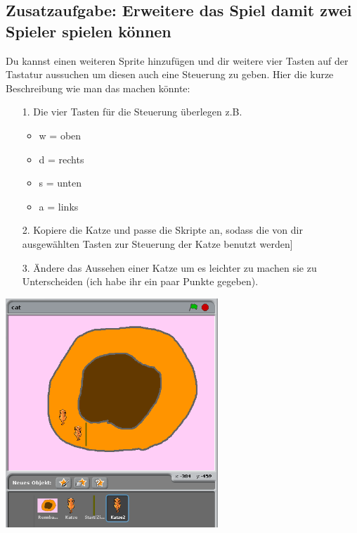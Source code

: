 \subsection{Zusatzaufgabe: Erweitere das Spiel damit zwei Spieler spielen können}
Du kannst einen weiteren Sprite hinzufügen und dir weitere vier Tasten auf der Tastatur aussuchen um diesen auch eine Steuerung zu geben. Hier die kurze Beschreibung wie man das machen könnte:
\begin{itemize}
\item[1. ] Die vier Tasten für die Steuerung überlegen z.B.
  \begin{itemize}
  \item w = oben
  \item d = rechts
  \item s = unten
  \item a = links
\end{itemize}
\item[2. ] Kopiere die Katze und passe die Skripte an, sodass die von dir ausgewählten Tasten zur Steuerung der Katze benutzt werden]
  \item[3. ] Ändere das Aussehen einer Katze um es leichter zu machen sie zu Unterscheiden (ich habe ihr ein paar Punkte gegeben).
\end{itemize}
\includegraphics[width=0.6\textwidth]{images/aufgabe4_multiplayer.png}
